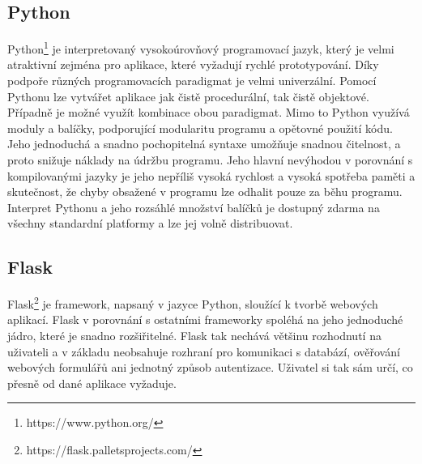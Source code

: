 \subsection*{Python}
Python\footnote{https://www.python.org/} je interpretovaný vysokoúrovňový programovací jazyk, který je velmi atraktivní zejména pro aplikace, které vyžadují rychlé prototypování. Díky podpoře různých programovacích paradigmat je velmi univerzální. Pomocí Pythonu lze vytvářet aplikace jak čistě procedurální, tak čistě objektové. Případně je možné využít kombinace obou paradigmat. Mimo to Python využívá moduly a balíčky, podporující modularitu programu a opětovné použití kódu. Jeho jednoduchá a snadno pochopitelná syntaxe umožňuje snadnou čitelnost, a proto snižuje náklady na údržbu programu. Jeho hlavní nevýhodou v porovnání s kompilovanými jazyky je jeho nepříliš vysoká rychlost a vysoká spotřeba paměti a skutečnost, že chyby obsažené v programu lze odhalit pouze za běhu programu. Interpret Pythonu a jeho rozsáhlé množství balíčků je dostupný zdarma na všechny standardní platformy a lze jej volně distribuovat. 

\subsection*{Flask}
\label{subsec_Flask}
Flask\footnote{https://flask.palletsprojects.com/} je framework, napsaný v jazyce Python, sloužící k tvorbě webových aplikací. Flask v porovnání s ostatními frameworky spoléhá na jeho jednoduché jádro, které je snadno rozšiřitelné. Flask tak nechává většinu rozhodnutí na uživateli a v základu neobsahuje rozhraní pro komunikaci s databází, ověřování webových formulářů ani jednotný způsob autentizace. Uživatel si tak sám určí, co přesně od dané aplikace vyžaduje. 


